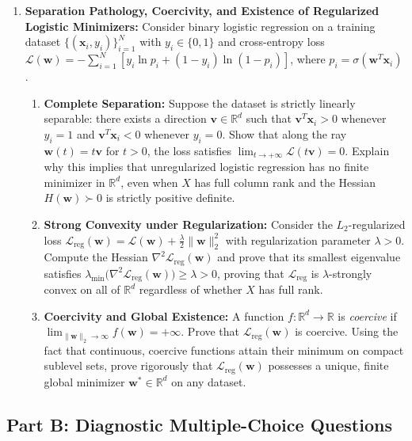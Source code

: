 \begin{enumerate}[label=\textbf{P\arabic*.}]
    \item \textbf{Separation Pathology, Coercivity, and Existence of Regularized Logistic Minimizers:}
    Consider binary logistic regression on a training dataset $\{(\mathbf{x}_i, y_i)\}_{i=1}^N$ with $y_i \in \{0, 1\}$ and cross-entropy loss $\mathcal{L}(\mathbf{w}) = -\sum_{i=1}^N [y_i \ln p_i + (1 - y_i)\ln(1 - p_i)]$, where $p_i = \sigma(\mathbf{w}^T \mathbf{x}_i)$.
    \begin{enumerate}[label=(\alph*)]
        \item \textbf{Complete Separation:} Suppose the dataset is strictly linearly separable: there exists a direction $\mathbf{v} \in \mathbb{R}^d$ such that $\mathbf{v}^T \mathbf{x}_i > 0$ whenever $y_i = 1$ and $\mathbf{v}^T \mathbf{x}_i < 0$ whenever $y_i = 0$. Show that along the ray $\mathbf{w}(t) = t \mathbf{v}$ for $t > 0$, the loss satisfies $\lim_{t \to +\infty} \mathcal{L}(t\mathbf{v}) = 0$. Explain why this implies that unregularized logistic regression has no finite minimizer in $\mathbb{R}^d$, even when $X$ has full column rank and the Hessian $H(\mathbf{w}) \succ 0$ is strictly positive definite.
        \item \textbf{Strong Convexity under Regularization:} Consider the $L_2$-regularized loss $\mathcal{L}_{\text{reg}}(\mathbf{w}) = \mathcal{L}(\mathbf{w}) + \frac{\lambda}{2}\|\mathbf{w}\|_2^2$ with regularization parameter $\lambda > 0$. Compute the Hessian $\nabla^2 \mathcal{L}_{\text{reg}}(\mathbf{w})$ and prove that its smallest eigenvalue satisfies $\lambda_{\min}\big(\nabla^2 \mathcal{L}_{\text{reg}}(\mathbf{w})\big) \ge \lambda > 0$, proving that $\mathcal{L}_{\text{reg}}$ is $\lambda$-strongly convex on all of $\mathbb{R}^d$ regardless of whether $X$ has full rank.
        \item \textbf{Coercivity and Global Existence:} A function $f: \mathbb{R}^d \to \mathbb{R}$ is \emph{coercive} if $\lim_{\|\mathbf{w}\|_2 \to \infty} f(\mathbf{w}) = +\infty$. Prove that $\mathcal{L}_{\text{reg}}(\mathbf{w})$ is coercive. Using the fact that continuous, coercive functions attain their minimum on compact sublevel sets, prove rigorously that $\mathcal{L}_{\text{reg}}(\mathbf{w})$ possesses a unique, finite global minimizer $\mathbf{w}^* \in \mathbb{R}^d$ on any dataset.
    \end{enumerate}
\end{enumerate}

\subsection*{Part B: Diagnostic Multiple-Choice Questions}

